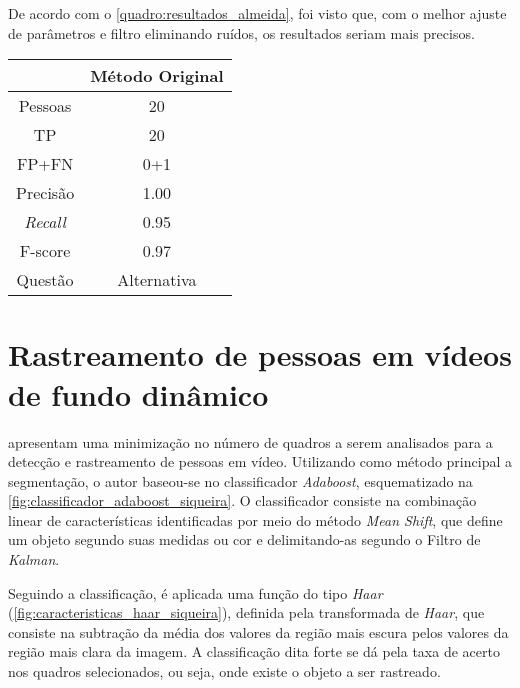 \documentclass[12pt,oneside,a4paper,chapter=TITLE,section=TITLE,sumario=tradicional]{abntex2}
\begin{document}
De acordo com o \autoref{quadro:resultados_almeida}, foi visto que, com o melhor ajuste de parâmetros e filtro eliminando ruídos, os resultados seriam mais precisos.

\begin{quadro}[htb]
    \begin{tabular}{|c|c|}
        \hline
        \textbf{} & \textbf{Método Original}\\ 
        \hline\hline
        Pessoas & 20\\ \hline
        TP  & 20\\ \hline
        FP+FN    & 0+1\\ \hline
        Precisão  & 1.00\\ \hline
        \textit{Recall}  & 0.95\\ \hline
        F-score & 0.97\\ \hline
        Questão & Alternativa\\ \hline
    \end{tabular}
    
\end{quadro}

\section{Rastreamento de pessoas em vídeos de fundo dinâmico}

 apresentam uma minimização no número de quadros a serem analisados para a detecção e rastreamento de pessoas em vídeo. Utilizando como método principal a segmentação, o autor baseou-se no classificador \textit{Adaboost}, esquematizado na \autoref{fig:classificador_adaboost_siqueira}. O classificador consiste na combinação linear de características identificadas por meio do método \textit{Mean Shift}, que define um objeto segundo suas medidas ou cor e delimitando-as segundo o Filtro de \textit{Kalman}.

\begin{figure}[htb]
\end{figure}

\newpage

Seguindo a classificação, é aplicada uma função do tipo \textit{Haar} (\autoref{fig:caracteristicas_haar_siqueira}), definida pela transformada de \textit{Haar}, que consiste na subtração da média dos valores da região mais escura pelos valores da região mais clara da imagem. A classificação dita forte se dá pela taxa de acerto nos quadros selecionados, ou seja, onde existe o objeto a ser rastreado.
\end{document}
